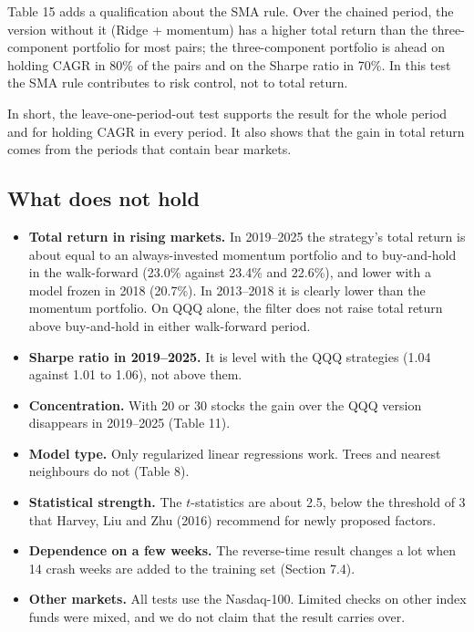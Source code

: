 \documentclass[11pt]{article}
\providecommand{\tightlist}{\setlength{\itemsep}{2pt}\setlength{\parskip}{0pt}}
\begin{document}
Table 15 adds a qualification about the SMA rule. Over the chained period, the version without it (Ridge + momentum) has a higher total return than the three-component portfolio for most pairs; the three-component portfolio is ahead on holding CAGR in 80\% of the pairs and on the Sharpe ratio in 70\%. In this test the SMA rule contributes to risk control, not to total return.

In short, the leave-one-period-out test supports the result for the whole period and for holding CAGR in every period. It also shows that the gain in total return comes from the periods that contain bear markets.

\subsection{What does not hold}

\begin{itemize}
\tightlist
\item
  \textbf{Total return in rising markets.} In 2019--2025 the strategy's total return is about equal to an always-invested momentum portfolio and to buy-and-hold in the walk-forward (23.0\% against 23.4\% and 22.6\%), and lower with a model frozen in 2018 (20.7\%). In 2013--2018 it is clearly lower than the momentum portfolio. On QQQ alone, the filter does not raise total return above buy-and-hold in either walk-forward period.
\item
  \textbf{Sharpe ratio in 2019--2025.} It is level with the QQQ strategies (1.04 against 1.01 to 1.06), not above them.
\item
  \textbf{Concentration.} With 20 or 30 stocks the gain over the QQQ version disappears in 2019--2025 (Table 11).
\item
  \textbf{Model type.} Only regularized linear regressions work. Trees and nearest neighbours do not (Table 8).
\item
  \textbf{Statistical strength.} The \(t\)-statistics are about 2.5, below the threshold of 3 that Harvey, Liu and Zhu (2016) recommend for newly proposed factors.
\item
  \textbf{Dependence on a few weeks.} The reverse-time result changes a lot when 14 crash weeks are added to the training set (Section 7.4).
\item
  \textbf{Other markets.} All tests use the Nasdaq-100. Limited checks on other index funds were mixed, and we do not claim that the result carries over.
\end{itemize}
\end{document}
